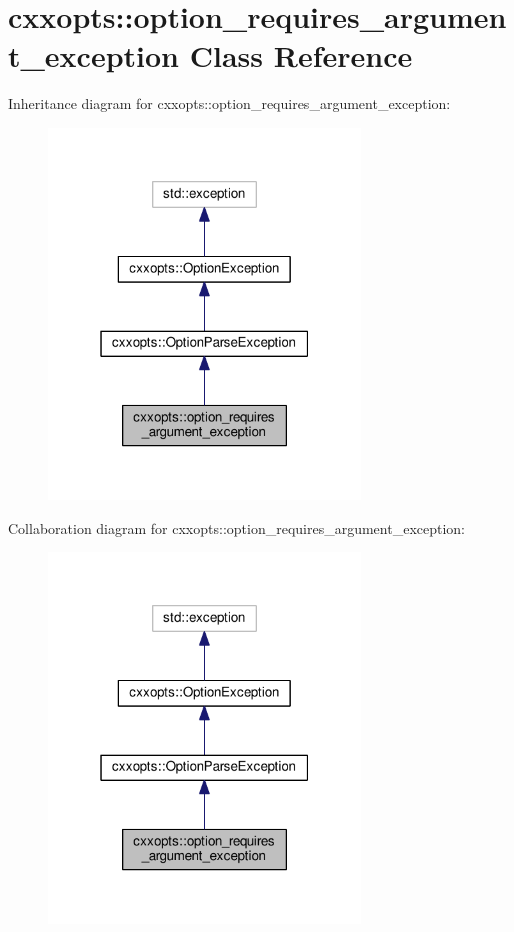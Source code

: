 \hypertarget{classcxxopts_1_1option__requires__argument__exception}{}\section{cxxopts\+:\+:option\+\_\+requires\+\_\+argument\+\_\+exception Class Reference}
\label{classcxxopts_1_1option__requires__argument__exception}


Inheritance diagram for cxxopts\+:\+:option\+\_\+requires\+\_\+argument\+\_\+exception\+:
\nopagebreak
\begin{figure}[H]
\begin{center}
\leavevmode
\includegraphics[width=235pt]{classcxxopts_1_1option__requires__argument__exception__inherit__graph}
\end{center}
\end{figure}


Collaboration diagram for cxxopts\+:\+:option\+\_\+requires\+\_\+argument\+\_\+exception\+:
\nopagebreak
\begin{figure}[H]
\begin{center}
\leavevmode
\includegraphics[width=235pt]{classcxxopts_1_1option__requires__argument__exception__coll__graph}
\end{center}
\end{figure}
